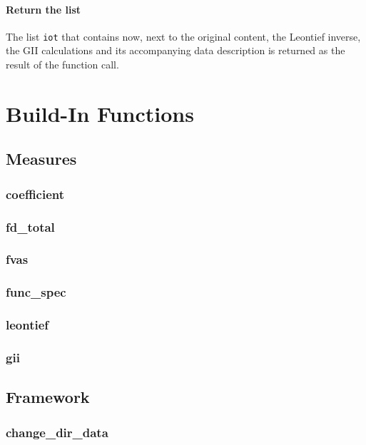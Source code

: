 \documentclass[10pt,a4paper]{paper}
\begin{document}
	\paragraph{Return the list} The list \texttt{iot} that contains now, next to the original content, the Leontief inverse, the GII calculations and its accompanying data description is returned as the result of the function call.
	
	\section{Build-In Functions}
	\subsection{Measures}
	
	\subsubsection{coefficient}
	
	\subsubsection{fd\_total}
	
	\subsubsection{fvas}
	
	\subsubsection{func\_spec}
	
	\subsubsection{leontief}
	
	\subsubsection{gii}
	
	\subsection{Framework}
	
	\subsubsection{change\_dir\_data}
		
\end{document}
